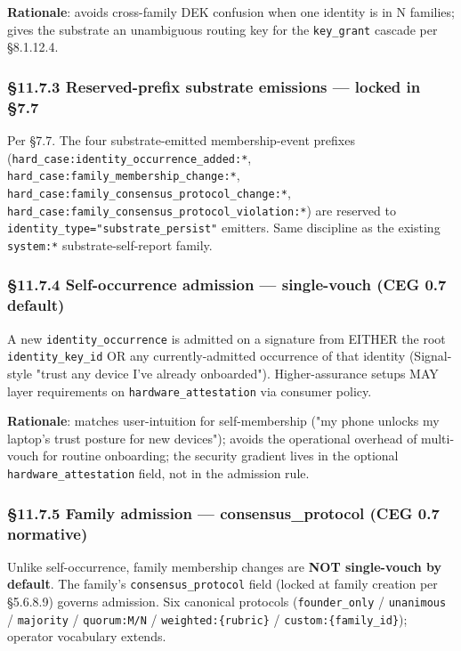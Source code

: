 \documentclass[11pt]{article}
\begin{document}
\textbf{Rationale}: avoids cross-family DEK confusion when one identity is in N families; gives the substrate an unambiguous routing key for the \texttt{key\_grant} cascade per §8.1.12.4.


\subsubsection*{§11.7.3 Reserved-prefix substrate emissions — locked in §7.7}


Per §7.7. The four substrate-emitted membership-event prefixes (\texttt{hard\_case:identity\_occurrence\_added:*}, \texttt{hard\_case:family\_membership\_change:*}, \texttt{hard\_case:family\_consensus\_protocol\_change:*}, \texttt{hard\_case:family\_consensus\_protocol\_violation:*}) are reserved to \texttt{identity\_type="substrate\_persist"} emitters. Same discipline as the existing \texttt{system:*} substrate-self-report family.


\subsubsection*{§11.7.4 Self-occurrence admission — single-vouch (CEG 0.7 default)}


A new \texttt{identity\_occurrence} is admitted on a signature from EITHER the root \texttt{identity\_key\_id} OR any currently-admitted occurrence of that identity (Signal-style "trust any device I've already onboarded"). Higher-assurance setups MAY layer requirements on \texttt{hardware\_attestation} via consumer policy.


\textbf{Rationale}: matches user-intuition for self-membership ("my phone unlocks my laptop's trust posture for new devices"); avoids the operational overhead of multi-vouch for routine onboarding; the security gradient lives in the optional \texttt{hardware\_attestation} field, not in the admission rule.


\subsubsection*{§11.7.5 Family admission — consensus\_protocol (CEG 0.7 normative)}


Unlike self-occurrence, family membership changes are \textbf{NOT single-vouch by default}. The family's \texttt{consensus\_protocol} field (locked at family creation per §5.6.8.9) governs admission. Six canonical protocols (\texttt{founder\_only} / \texttt{unanimous} / \texttt{majority} / \texttt{quorum:M/N} / \texttt{weighted:\{rubric\}} / \texttt{custom:\{family\_id\}}); operator vocabulary extends.
\end{document}
